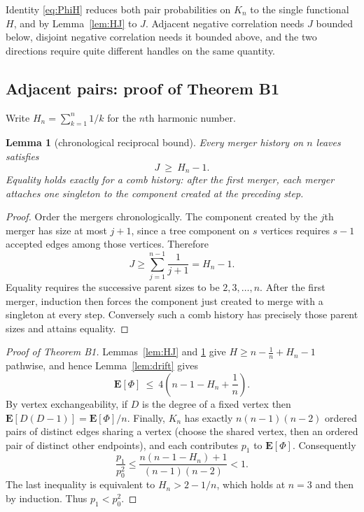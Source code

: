 \documentclass[11pt,a4paper]{amsart}
\theoremstyle{plain}
\newtheorem{lemma}[theorem]{Lemma}
\theoremstyle{definition}
\theoremstyle{remark}
\newcommand{\E}{\mathbf{E}}
\begin{document}
Identity \eqref{eq:PhiH} reduces both pair probabilities on $K_n$ to the single
functional $H$, and by Lemma~\ref{lem:HJ} to $J$. Adjacent negative correlation
needs $J$ bounded below, disjoint negative correlation needs it bounded above,
and the two directions require quite different handles on the same quantity.

\subsection{Adjacent pairs: proof of Theorem B1}

Write $H_n=\sum_{k=1}^n1/k$ for the $n$th harmonic number.

\begin{lemma}[chronological reciprocal bound]
\label{lem:harmonic}
Every merger history on $n$ leaves satisfies
\begin{equation}
\label{eq:Jlower}
J\ \ge\ H_n-1.
\end{equation}
Equality holds exactly for a comb history: after the first merger, each merger
attaches one singleton to the component created at the preceding step.
\end{lemma}

\begin{proof}
Order the mergers chronologically. The component created by the $j$th merger
has size at most $j+1$, since a tree component on $s$ vertices requires $s-1$
accepted edges among those vertices. Therefore
\[
J\ge\sum_{j=1}^{n-1}\frac1{j+1}=H_n-1.
\]
Equality requires the successive parent sizes to be $2,3,\ldots,n$. After the
first merger, induction then forces the component just created to merge with a
singleton at every step. Conversely such a comb history has precisely those
parent sizes and attains equality.
\end{proof}

\begin{proof}[Proof of Theorem B1]
Lemmas~\ref{lem:HJ} and \ref{lem:harmonic} give
$H\ge n-\frac1n+H_n-1$ pathwise, and hence Lemma~\ref{lem:drift} gives
\begin{equation}
\label{eq:Phiupper}
\E[\Phi]\ \le\ 4\left(n-1-H_n+\frac1n\right).
\end{equation}
By vertex exchangeability, if $D$ is the degree of a fixed vertex then
$\E[D(D-1)]=\E[\Phi]/n$. Finally, $K_n$ has exactly $n(n-1)(n-2)$
ordered pairs of distinct edges sharing a vertex (choose the shared vertex, then
an ordered pair of distinct other endpoints), and each contributes $p_1$ to
$\E[\Phi]$. Consequently
\[
\frac{p_1}{p_0^2}
\le \frac{n(n-1-H_n)+1}{(n-1)(n-2)}<1.
\]
The last inequality is equivalent to $H_n>2-1/n$, which holds at $n=3$ and
then by induction. Thus $p_1<p_0^2$. \qedhere
\end{proof}
\end{document}
